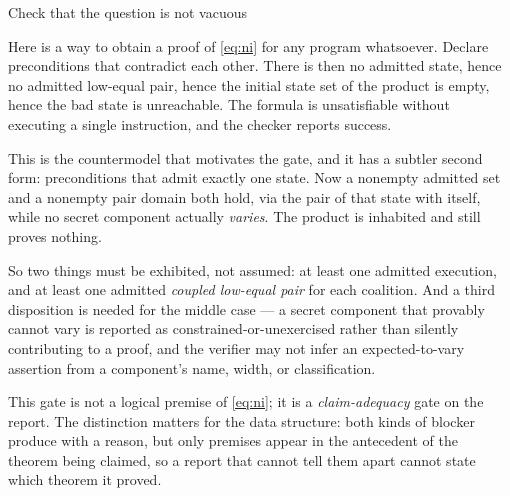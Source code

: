 \begin{step}{Check that the question is not vacuous}{%
}
\label{step:vacuity}

Here is a way to obtain a proof of \eqref{eq:ni} for any program whatsoever.
Declare preconditions that contradict each other. There is then no admitted
state, hence no admitted low-equal pair, hence the initial state set of the
product is empty, hence the bad state is unreachable. The formula is
unsatisfiable without executing a single instruction, and the checker reports
success.

This is the countermodel that motivates the gate, and it has a subtler second
form: preconditions that admit exactly one state. Now a nonempty admitted set
and a nonempty pair domain both hold, via the pair of that state with itself,
while no secret component actually \emph{varies}. The product is inhabited and
still proves nothing.

So two things must be exhibited, not assumed: at least one admitted execution,
and at least one admitted \emph{coupled low-equal pair} for each coalition. And a
third disposition is needed for the middle case --- a secret component that
provably cannot vary is reported as constrained-or-unexercised rather than
silently contributing to a proof, and the verifier may not infer an
expected-to-vary assertion from a component's name, width, or classification.

\begin{remark}
This gate is not a logical premise of \eqref{eq:ni}; it is a
\emph{claim-adequacy} gate on the report. The distinction matters for the data
structure: both kinds of blocker produce \Unknown{} with a reason, but only
premises appear in the antecedent of the theorem being claimed, so a report that
cannot tell them apart cannot state which theorem it proved.
\end{remark}
\end{step}

